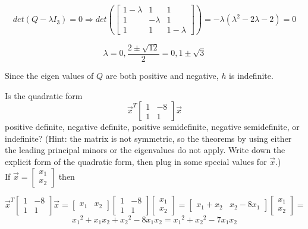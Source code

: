 \documentclass[12pt]{extarticle}
\theoremstyle{definition}
\begin{document}
\begin{problem}
\begin{description}
			$$det(Q - \lambda I_3) = 0 \Longrightarrow det(
			\begin{bmatrix}1-\lambda & 1 & 1\\ 1 & -\lambda & 1 \\ 1 & 1 & 1-\lambda\end{bmatrix}) = 
			-\lambda({\lambda}^2 - 2\lambda - 2) = 0$$

			$$\lambda = 0, \frac{2 \pm \sqrt{12}}{2} = 0, 1 \pm \sqrt{3}$$

			Since the eigen values of $Q$ are both positive and negative, $h$ is indefinite.


	\end{description}
\end{problem}

\begin{problem}
	Is the quadratic form 
	\[\vec{x}^T \begin{bmatrix}1 & -8\\ 1 & 1 \end{bmatrix}\vec{x}\]
	positive definite, negative definite, positive semidefinite, negative semidefinite, or indefinite? (Hint: the matrix is not symmetric, so the theorems by using either the leading principal minors or the eigenvalues do not apply. Write down the explicit form of the quadratic form, then plug in some special values for $\vec{x}$.)\\

		If $\vec{x} = \begin{bmatrix}x_1\\x_2\end{bmatrix}$ then 

		$$\vec{x}^T \begin{bmatrix}1 & -8\\ 1 & 1 \end{bmatrix}\vec{x} = 
		\begin{bmatrix}x_1 & x_2\end{bmatrix}\begin{bmatrix}1 & -8\\ 1 & 1 \end{bmatrix}\begin{bmatrix}x_1\\x_2\end{bmatrix} = 
		\begin{bmatrix} x_1 + x_2 & x_2 - 8x_1\end{bmatrix}\begin{bmatrix}x_1\\x_2\end{bmatrix} = $$
		$${x_1}^2 + x_1 x_2 + {x_2}^2 - 8x_1 x_2 = {x_1}^2 + {x_2}^2 - 7x_1 x_2$$


\end{problem}
\end{document}
